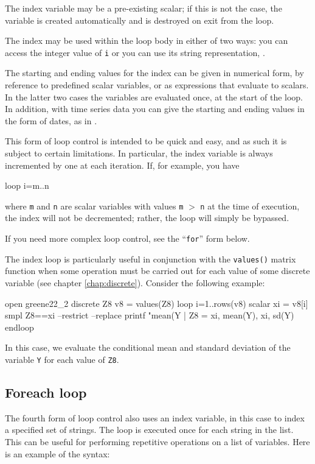 The index variable may be a pre-existing scalar; if this is not the
case, the variable is created automatically and is destroyed on exit
from the loop.

The index may be used within the loop body in either of two ways: you
can access the integer value of \verb+i+ or you can use its string
representation, .

The starting and ending values for the index can be given in numerical
form, by reference to predefined scalar variables, or as expressions
that evaluate to scalars.  In the latter two cases the variables are
evaluated once, at the start of the loop.  In addition, with time
series data you can give the starting and ending values in the form of
dates, as in .

This form of loop control is intended to be quick and easy, and as
such it is subject to certain limitations. In particular, the index
variable is always incremented by one at each iteration.  If, for
example, you have
\begin{code}
loop i=m..n
\end{code}
where \texttt{m} and \texttt{n} are scalar variables with values
\texttt{m} $>$ \texttt{n} at the time of execution, the index will not
be decremented; rather, the loop will simply be bypassed.

If you need more complex loop control, see the ``\texttt{for}'' form
below.

The index loop is particularly useful in conjunction with the
\texttt{values()} matrix function when some operation must be carried
out for each value of some discrete variable (see chapter
\ref{chap:discrete}). Consider the following example:

\begin{code}
open greene22_2
discrete Z8
v8 = values(Z8)
loop i=1..rows(v8)
  scalar xi = v8[i]
  smpl Z8==xi --restrict --replace
  printf "mean(Y | Z8 = %
    xi, mean(Y), xi, sd(Y)
endloop
\end{code}

In this case, we evaluate the conditional mean and standard deviation
of the variable \texttt{Y} for each value of \texttt{Z8}.

\subsection{Foreach loop}
\label{loop-each}

The fourth form of loop control also uses an index variable, in this
case to index a specified set of strings.  The loop is executed once
for each string in the list.  This can be useful for performing
repetitive operations on a list of variables.  Here is an example of
the syntax:
      
